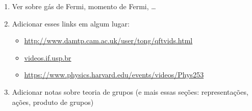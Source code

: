 \begin{enumerate}
\item Ver sobre gás de Fermi, momento de Fermi, \dots
\item Adicionar esses links em algum lugar:
	\begin{itemize}
		\item \url{http://www.damtp.cam.ac.uk/user/tong/qftvids.html}
		\item \url{videos.if.usp.br}
		\item \url{https://www.physics.harvard.edu/events/videos/Phys253}
	\end{itemize}
\item Adicionar notas sobre teoria de grupos (e mais essas seções: representações, ações, produto de grupos)
\end{enumerate}
